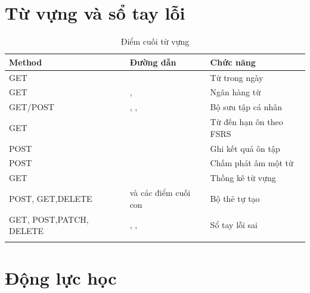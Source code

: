 \section{Từ vựng và sổ tay lỗi}

\begin{longtable}{L{2.8cm} L{6.2cm} L{4.6cm}}
\toprule
\textbf{Method} & \textbf{Đường dẫn} & \textbf{Chức năng}\\
\midrule
\endhead
GET &  & Từ trong ngày\\
GET & ,  & Ngân hàng từ\\
GET/POST & , ,  & Bộ sưu tập cá nhân\\
GET &  & Từ đến hạn ôn theo FSRS\\
POST &  & Ghi kết quả ôn tập\\
POST &  & Chấm phát âm một từ\\
GET &  & Thống kê từ vựng\\
POST, GET,\newline DELETE &  và các điểm cuối con & Bộ thẻ tự tạo\\
GET, POST,\newline PATCH, DELETE & , ,  & Sổ tay lỗi sai\\
\bottomrule
\caption{Điểm cuối từ vựng}
\end{longtable}

\section{Động lực học}

